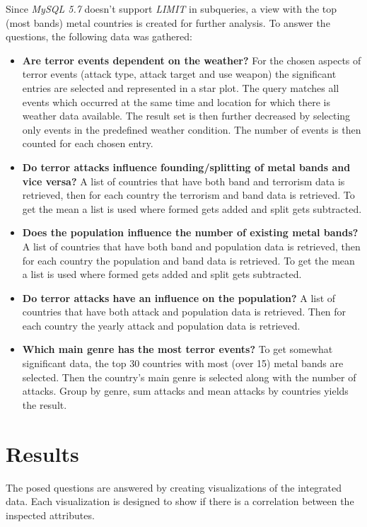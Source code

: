 Since \emph{MySQL 5.7} doesn't support \emph{LIMIT} in subqueries, a view with the top (most bands) metal countries is created for further analysis. To answer the questions, the following data was gathered:
\begin{itemize}
\item \textbf{Are terror events dependent on the weather?}  For the chosen aspects of terror events (attack type, attack target and use weapon) the significant entries are selected and represented in a star plot. The query matches all events which occurred at the same time and location for which there is weather data available. The result set is then further decreased by selecting only events in the predefined weather condition. The number of events is then counted for each chosen entry.

\item \textbf{Do terror attacks influence founding/splitting of metal bands and vice versa?}
A list of countries that have both band and terrorism data is retrieved, then for each country the terrorism and band data is retrieved. To get the mean a list is used where formed gets added and split gets subtracted.
\item \textbf{Does the population influence the number of existing metal bands?}
A list of countries that have both band and population data is retrieved, then for each country the population and band data is retrieved. To get the mean a list is used where formed gets added and split gets subtracted.
\item \textbf{Do terror attacks have an influence on the population?}
A list of countries that have both attack and population data is retrieved. Then for each country the yearly attack and population data is retrieved.
\item \textbf{Which main genre has the most terror events?} To get somewhat significant data, the top 30 countries with most (over 15) metal bands are selected. Then the country's main genre is selected along with the number of attacks. Group by genre, sum attacks and mean attacks by countries yields the result.
\end{itemize}



\newpage
\section{Results}
The posed questions are answered by creating visualizations of the integrated data. Each visualization is designed to show if there is a correlation between the inspected attributes.

